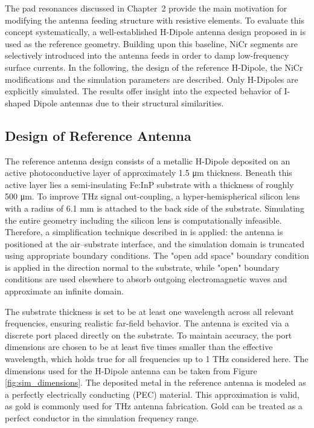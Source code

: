 The pad resonances discussed in Chapter~2 provide the main motivation for modifying the antenna feeding structure with resistive elements. To evaluate this concept systematically, a well-established H-Dipole
antenna design proposed in \cite{nandiErAsInAlGaAsPhotoconductors2021} is used as the reference geometry. Building upon this baseline, NiCr segments are selectively introduced into the antenna feeds in order to damp low-frequency surface currents. In the following, the design of the reference H-Dipole, the NiCr modifications and the simulation parameters are described. Only H-Dipoles are explicitly simulated. The results offer insight into the expected behavior of I-shaped Dipole antennas due to their structural similarities. 

\subsection{Design of Reference Antenna}

The reference antenna design consists of a metallic H-Dipole deposited on an active photoconductive layer of approximately \num{1.5} \si{\micro\meter} thickness. Beneath this active layer lies a semi-insulating Fe:InP substrate with a thickness of roughly \num{500} \si{\micro\meter}. To improve THz signal out-coupling, a hyper-hemispherical silicon lens with a radius of \num{6.1} \si{\milli\meter} is attached to the back side of the substrate. Simulating the entire geometry including the silicon lens is computationally infeasible. Therefore, a simplification technique described in \cite{llombartTHzTimeDomainSensing2012,garufoNortonEquivalentCircuit2018} is applied: the antenna is positioned at the air–substrate interface, and the simulation domain is truncated using appropriate boundary conditions. The "open add space" boundary condition is applied in the direction normal to the substrate, while "open" boundary conditions are used elsewhere to absorb outgoing electromagnetic waves and approximate an infinite domain.

The substrate thickness is set to be at least one wavelength across all relevant frequencies, ensuring realistic far-field behavior. The antenna is excited via a discrete port placed directly on the substrate. To maintain accuracy, the port dimensions are chosen to be at least five times smaller than the effective wavelength, which holds true for all frequencies up to \num{1} \si{\tera\hertz} considered here. The dimensions used for the H-Dipole antenna can be taken from Figure \ref{fig:sim_dimensions}. The deposited metal in the reference antenna is modeled as a perfectly electrically conducting (PEC) material. This approximation is valid, as gold is commonly used for THz antenna fabrication. Gold can be treated as a perfect conductor in the simulation frequency range.

